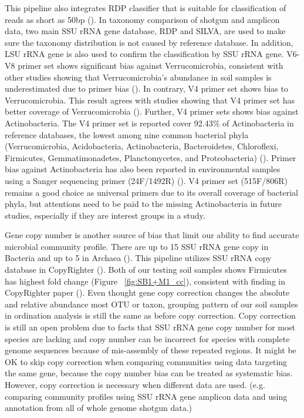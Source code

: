 \documentclass[12pt]{article}
\begin{document}
This pipeline also integrates RDP classifier that is suitable for
classification of reads as short as 50bp (\cite{rdpclassifier}). In
taxonomy comparison of shotgun and amplicon data, two main SSU rRNA
gene database, RDP and SILVA, are used to make sure the taxonomy
distribution is not caused by reference database. In addition, LSU
rRNA gene is also used to confirm the classification by SSU rRNA
gene. V6-V8 primer set shows significant bias against Verrucomicrobia,
consistent with other studies showing that Verrucomicrobia’s abundance
in soil samples is underestimated due to primer bias
(\cite{verruco2011}). In contrary, V4 primer set shows bias to
Verrucomicrobia. This result agrees with studies showing that V4
primer set has better coverage of Verrucomicrobia
(\cite{verruco2011}). Further, V4 primer sets shows bias against
Actinobacteria. The V4 primer set is reported cover 92.43\% of
Actinobacteria in reference databases, the lowest among nine common
bacterial phyla (Verrucomicrobia, Acidobacteria, Actinobacteria,
Bacteroidetes, Chloroflexi, Firmicutes, Gemmatimonadetes,
Planctomycetes, and Proteobacteria) (\cite{verruco2011}). Primer bias
against Actinobacteria has also been reported in environmental samples
using a Sanger sequencing primer (24F/1492R) (\cite{actinobias}). V4
primer set (515F/806R) remains a good choice as universal primers due
to its overall coverage of bacterial phyla, but attentions need to be
paid to the missing Actinobacteria in future studies, especially if
they are interest groups in a study.

Gene copy number is another source of bias that limit our ability to
find accurate microbial community profile. There are up to 15 SSU rRNA
gene copy in Bacteria and up to 5 in Archaea
(\cite{rrncopy2004}). This pipeline utilizes SSU rRNA copy database in
CopyRighter (\cite{copyrighter}). Both of our testing soil samples
shows Firmicutes has highest fold change (Figure
~\ref{fig:SB1+M1_cc}), consistent with finding in CopyRighter paper
(\cite{copyrighter}). Even thought gene copy correction changes the
absolute and relative abundance most OTU or taxon, grouping pattern of
our soil samples in ordination analysis is still the same as before
copy correction. Copy correction is still an open problem due to facts
that SSU rRNA gene copy number for most species are lacking and copy
number can be incorrect for species with complete genome sequences
because of mis-assembly of these repeated regions. It might be OK to
skip copy correction when comparing communities using data targeting
the same gene, because the copy number bias can be treated as
systematic bias. However, copy correction is necessary when different
data are used. (e.g. comparing community profiles using SSU rRNA gene
amplicon data and using annotation from all of whole genome shotgun
data.)
\end{document}

